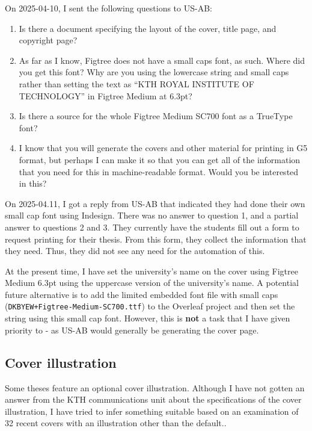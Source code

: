 \documentclass[12pt, twoside]{article}
\begin{document}
On 2025-04-10, I sent the following questions to US-AB:
\begin{enumerate}
    \item Is there a document specifying the layout of the cover, title page, and copyright page?
    
    \item As far as I know, Figtree does not have a small caps font, as such. Where did you get this font? Why are you using the lowercase string and small caps rather than setting the text as \enquote{KTH ROYAL INSTITUTE OF TECHNOLOGY} in Figtree Medium at 6.3pt?
    
    \item Is there a source for the whole Figtree Medium SC700 font as a TrueType font?
        
    \item  I know that you will generate the covers and other material for printing in G5 format, but perhaps I can make it so that you can get all of the information that you need for this in machine-readable format. Would you be interested in this?
\end{enumerate}  

On 2025-04.11, I got a reply from US-AB that indicated they had done their own small cap font using Indesign. There was no answer to question 1, and a partial answer to questions 2 and 3. They currently have the students fill out a form to request printing for their thesis. From this form, they collect the information that they need. Thus, they did not see any need for the automation of this.

At the present time, I have set the university's name on the cover using Figtree Medium 6.3pt using the uppercase version of the university's name. A potential future alternative is to add the limited embedded font file with small caps (\texttt{DKBYEW+Figtree-Medium-SC700.ttf}) to the Overleaf project and then set the string using this small cap font. However, this is \textbf{not} a task that I have given priority to - as US-AB would generally be generating the cover page.



\subsection{Cover illustration}
\label{sec:cycle3coverIllustration}
Some theses feature an optional cover illustration. Although I have not gotten an answer from the KTH communications unit about the specifications of the cover illustration, I have tried to infer something suitable based on an examination of 32 recent covers with an illustration other than the default..
\end{document}
